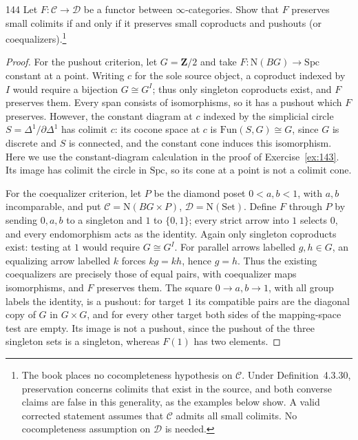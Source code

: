 \begin{exercise}{144}
Let $F\colon\mathcal C\to\mathcal D$ be a functor between $\infty$-categories. Show that $F$ preserves
small colimits if and only if it preserves small coproducts and pushouts (or coequalizers).\footnote{The
book places no cocompleteness hypothesis on $\mathcal C$. Under Definition~4.3.30,
preservation concerns colimits that exist in the source, and both converse claims
are false in this generality, as the examples below show. A valid corrected
statement assumes that $\mathcal C$ admits all small colimits. No cocompleteness
assumption on $\mathcal D$ is needed.}

\begin{proof}
For the pushout criterion, let $G=\mathbf Z/2$ and take
$F\colon\mathrm N(BG)\to\mathrm{Spc}$ constant at a point.
Writing $c$ for the sole source object, a coproduct indexed by $I$ would
require a bijection $G\cong G^I$; thus only singleton coproducts exist,
and $F$ preserves them.
Every span consists of isomorphisms, so it has a pushout which $F$ preserves.
However, the constant diagram at $c$ indexed by the simplicial circle
$S=\Delta^1/\partial\Delta^1$ has colimit $c$: its cocone space at $c$
is $\mathrm{Fun}(S,G)\cong G$, since $G$ is discrete and $S$ is connected,
and the constant cone induces this isomorphism.
Here we use the constant-diagram calculation in the proof of
Exercise~\ref{ex:143}.
Its image has colimit the circle in $\mathrm{Spc}$, so its cone at a point
is not a colimit cone.

For the coequalizer criterion, let $P$ be the diamond poset
$0<a,b<1$, with $a,b$ incomparable, and put
$\mathcal C=\mathrm N(BG\times P)$, $\mathcal D=\mathrm N(\mathrm{Set})$.
Define $F$ through $P$ by sending $0,a,b$ to a singleton and $1$ to
$\{0,1\}$; every strict arrow into $1$ selects $0$, and every endomorphism
acts as the identity.
Again only singleton coproducts exist: testing at $1$ would require
$G\cong G^I$. For parallel arrows labelled $g,h\in G$, an equalizing
arrow labelled $k$ forces $kg=kh$, hence $g=h$.
Thus the existing coequalizers are precisely those of equal pairs,
with coequalizer maps isomorphisms, and $F$ preserves them.
The square $0\to a,b\to1$, with all group labels the identity, is a
pushout: for target $1$ its compatible pairs are the diagonal copy of
$G$ in $G\times G$, and for every other target both sides of the
mapping-space test are empty.
Its image is not a pushout, since the pushout of the three singleton
sets is a singleton, whereas $F(1)$ has two elements.


\end{proof}
\end{exercise}
